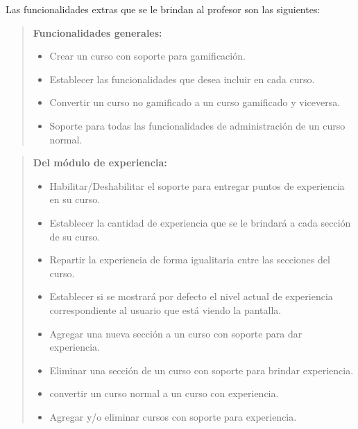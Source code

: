     \noindent
    Las funcionalidades extras que se le brindan al profesor son las siguientes:

    \begin{quote}
    {\bf Funcionalidades generales:}
        \begin{itemize}
        \item Crear un curso con soporte para gamificación.
        \item Establecer las funcionalidades que desea incluir en cada curso.
        \item Convertir un curso no gamificado a un curso gamificado y viceversa.
        \item Soporte para todas las funcionalidades de administración de un curso
              normal.
        \end{itemize}
    \end{quote}

    \begin{quote}
    {\bf Del módulo de experiencia:}
        \begin{itemize}
        \item Habilitar/Deshabilitar el soporte para entregar puntos de experiencia
              en su curso.
        \item Establecer la cantidad de experiencia que se le brindará a cada
              sección de su curso.
        \item Repartir la experiencia de forma igualitaria entre las secciones del
              curso.
        \item Establecer si se mostrará por defecto el nivel actual de experiencia
              correspondiente al usuario que está viendo la pantalla.
        \item Agregar una nueva sección a un curso con soporte para dar experiencia.
        \item Eliminar una sección de un curso con soporte para brindar experiencia.
        \item convertir un curso normal a un curso con experiencia.
        \item Agregar y/o eliminar cursos con soporte para experiencia.
        \end{itemize}
    \end{quote}

